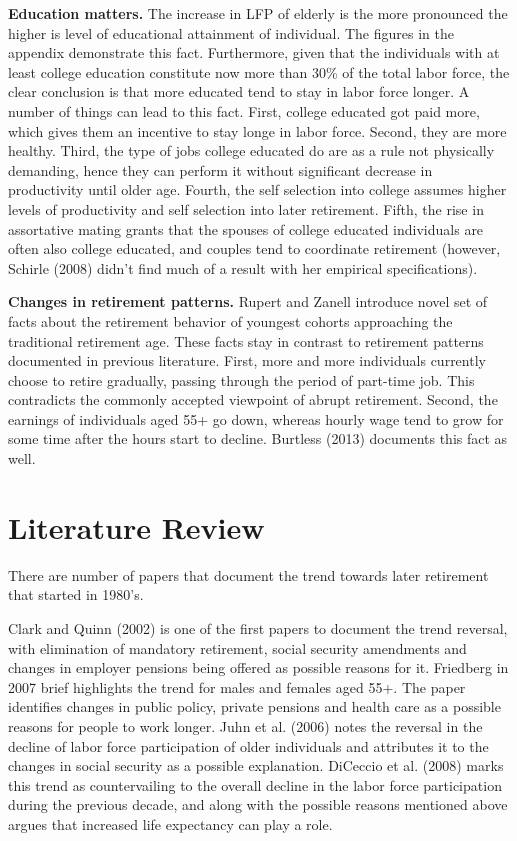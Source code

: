 \documentclass[
10pt, %
a4paper, %
oneside, %
headinclude,footinclude, %
BCOR5mm, %
]{scrartcl}
\begin{document}
\textbf{Education matters.} The increase in LFP of elderly is the more pronounced the higher is level of educational attainment of individual. The figures in the appendix demonstrate this fact. Furthermore, given that the individuals with at least college education constitute now more than 30\% of the total labor force, the clear conclusion is that more educated tend to stay in labor force longer. A number of things can lead to this fact. First, college educated got paid more, which gives them an incentive to stay longe in labor force. Second, they are more healthy. Third, the type of jobs college educated do are as a rule not physically demanding, hence they can perform it without significant decrease in productivity until older age. Fourth, the self selection into college assumes higher levels of productivity and self selection into later retirement. Fifth, the rise in assortative mating grants that the spouses of college educated individuals are often also college educated, and couples tend to coordinate retirement (however, Schirle (2008\cite{Schirle2008}) didn't find much of a result with her empirical specifications).

\textbf{Changes in retirement patterns.} Rupert and Zanell \cite{Rupert2015} introduce novel set of facts about the retirement behavior of youngest cohorts approaching the traditional retirement age. These facts stay in contrast to retirement patterns documented in previous literature. First, more and more individuals currently choose to retire gradually, passing through the period of part-time job. This contradicts the commonly accepted viewpoint of abrupt retirement. Second, the earnings of individuals aged 55+ go down, whereas hourly wage tend to grow for some time after the hours start to decline.  Burtless (2013) documents this fact as well.

\section{Literature Review}
There are number of papers that document the trend towards later retirement that started in 1980's.

Clark and Quinn (2002\cite{Clark2002}) is one of the first papers to document the trend reversal, with elimination of mandatory retirement,  social security amendments and changes in employer pensions being offered as possible reasons for it. Friedberg in 2007\cite{Friedberg2007} brief highlights the trend for males and females aged 55+. The paper identifies changes in public policy, private pensions and health care as a possible reasons for people to work longer. Juhn et al. (2006\cite{Juhn2006}) notes the reversal in the decline of labor force participation of older individuals and attributes it to the changes in social security as a possible explanation. DiCeccio et al. (2008\cite{DiCecio2008}) marks this trend as countervailing to the overall decline in the labor force participation during the previous decade, and along with the possible reasons mentioned above argues that increased life expectancy can play a role. 
\end{document}

